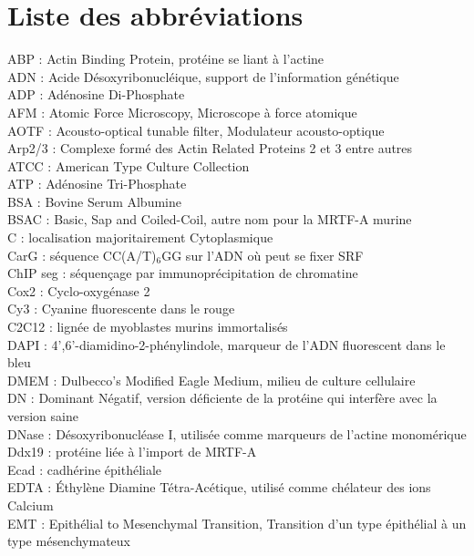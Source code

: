 \chapter*{Liste des abbréviations}


\noindent ABP : Actin Binding Protein, protéine se liant à l'actine\\
ADN : Acide Désoxyribonucléique, support de l'information génétique\\
ADP : Adénosine Di-Phosphate\\
AFM : Atomic Force Microscopy, Microscope à force atomique\\
AOTF : Acousto-optical tunable filter, Modulateur acousto-optique\\
Arp2/3 : Complexe formé des Actin Related Proteins 2 et 3 entre autres\\
ATCC : American Type Culture Collection\\
ATP : Adénosine Tri-Phosphate\\
BSA : Bovine Serum Albumine\\
BSAC : Basic, Sap and Coiled-Coil, autre nom pour la MRTF-A murine\\
C : localisation majoritairement Cytoplasmique\\
CarG : séquence CC(A/T)$_6$GG sur l'ADN où peut se fixer SRF\\
ChIP seg : séquençage par immunoprécipitation de chromatine\\
Cox2 : Cyclo-oxygénase 2\\
Cy3 : Cyanine fluorescente dans le rouge\\
C2C12 : lignée de myoblastes murins immortalisés\\
DAPI :  4',6'-diamidino-2-phénylindole, marqueur de l'ADN fluorescent dans le bleu\\
DMEM : Dulbecco's Modified Eagle Medium, milieu de culture cellulaire\\
DN : Dominant Négatif, version déficiente de la protéine qui interfère avec la version saine\\
DNase : Désoxyribonucléase I, utilisée comme marqueurs de l'actine monomérique\\
Ddx19 : protéine liée à l'import de MRTF-A\\
Ecad : cadhérine épithéliale\\
EDTA : Éthylène Diamine Tétra-Acétique, utilisé comme chélateur des ions Calcium\\
EMT : Epithélial to Mesenchymal Transition, Transition d'un type épithélial à un type mésenchymateux\\
